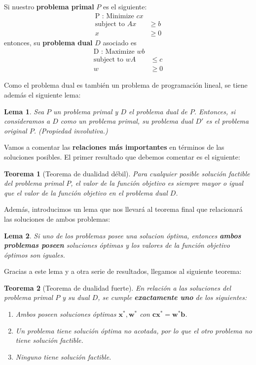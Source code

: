 \documentclass[a4paper]{article}
\newtheorem{thm}{Teorema}
\newtheorem{lema}{Lema}
\begin{document}
Si nuestro \textbf{problema primal} \(P\) es el siguiente:
\begin{align*}
\text{P : Minimize }  cx &\\
\text{subject to } Ax & \geq b\\
 x & \geq 0
\end{align*}
entonces, su \textbf{problema dual} \(D\) asociado es 
\begin{align*}
  \text{D : Maximize }  wb &\\
  \text{subject to }  wA & \leq c\\
   w & \geq 0
\end{align*}

Como el problema dual es también un problema de programación lineal, se tiene además el siguiente lema:

\begin{lema}
Sea \(P\) un problema primal y \(D\) el problema dual de \(P\). Entonces, si consideramos a \(D\) como un problema primal, su problema dual \(D'\) es el problema original \(P\). (\emph{Propiedad involutiva.})
\end{lema}

Vamos a comentar las \textbf{relaciones más importantes} en términos de las soluciones posibles. El primer resultado que debemos comentar es el siguiente:

\begin{thm}[Teorema de dualidad débil]
Para cualquier posible solución factible del problema primal \(P\), el valor de la función objetivo es siempre mayor o igual que el valor de la función objetivo en el problema dual \(D\). 
\end{thm}

Además, introducimos un lema que nos llevará al teorema final que relacionará las soluciones de ambos problemas:

\begin{lema}
Si uno de los problemas posee una solucion óptima, entonces \textbf{ambos problemas poseen} soluciones óptimas y los valores de la función objetivo óptimos son iguales.
\end{lema}

Gracias a este lema y a otra serie de resultados, llegamos al siguiente teorema:

\begin{thm}[Teorema de dualidad fuerte]\label{th:dual}
En relación a las soluciones del problema primal \(P\) y su dual \(D\), se cumple \textbf{exactamente uno} de los siguientes:
\begin{enumerate}

\item Ambos poseen soluciones óptimas \(\mathbf{x}^*, \mathbf{w}^*\) con \(\mathbf{c}\mathbf{x}^* = \mathbf{w}^*\mathbf{b}\).
\item Un problema tiene solución óptima no acotada, por lo que el otro problema no tiene solución factible.
\item Ninguno tiene solución factible.
\end{enumerate}
\end{thm}
\end{document}
